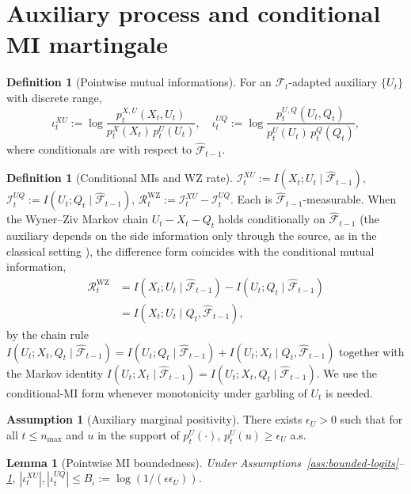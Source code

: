 \documentclass[11pt]{article}
\newcommand{\F}{\mathcal{F}}
\newcommand{\Fhat}{\hat{\F}}
\theoremstyle{plain}
\newtheorem{lemma}[theorem]{Lemma}
\theoremstyle{definition}
\newtheorem{definition}[theorem]{Definition}
\newtheorem{assumption}[theorem]{Assumption}
\theoremstyle{remark}
\begin{document}
\section{Auxiliary process and conditional MI martingale}\label{app:aux}

\begin{definition}[Pointwise mutual informations]\label{def:pmi-app}
For an $\F_t$-adapted auxiliary $\{U_t\}$ with discrete range,
\[
\iota_t^{XU} := \log \frac{p_t^{X,U}(X_t, U_t)}{p_t^X(X_t)\, p_t^U(U_t)},
\quad
\iota_t^{UQ} := \log \frac{p_t^{U,Q}(U_t, Q_t)}{p_t^U(U_t)\, p_t^Q(Q_t)},
\]
where conditionals are with respect to $\Fhat_{t-1}$.
\end{definition}

\begin{definition}[Conditional MIs and WZ rate]\label{def:WZ-rate}
$\mathcal{I}_t^{XU} := I(X_t; U_t \mid \Fhat_{t-1})$,
$\mathcal{I}_t^{UQ} := I(U_t; Q_t \mid \Fhat_{t-1})$,
$\mathcal{R}_t^{\mathrm{WZ}} := \mathcal{I}_t^{XU} - \mathcal{I}_t^{UQ}$.
Each is $\Fhat_{t-1}$-measurable. When the Wyner--Ziv Markov chain
$U_t - X_t - Q_t$ holds conditionally on $\Fhat_{t-1}$ (the
auxiliary depends on the side information only through the source,
as in the classical setting \citep{wyner1976rate}), the difference
form coincides with the conditional mutual information,
\[
\begin{split}
\mathcal{R}_t^{\mathrm{WZ}}
&= I(X_t; U_t \mid \Fhat_{t-1}) - I(U_t; Q_t \mid \Fhat_{t-1})\\
&= I(X_t; U_t \mid Q_t, \Fhat_{t-1}),
\end{split}
\]
by the chain rule $I(U_t; X_t, Q_t \mid \Fhat_{t-1}) =
I(U_t; Q_t \mid \Fhat_{t-1}) + I(U_t; X_t \mid Q_t, \Fhat_{t-1})$
together with the Markov identity $I(U_t; X_t \mid \Fhat_{t-1}) =
I(U_t; X_t, Q_t \mid \Fhat_{t-1})$. We use the conditional-MI form
whenever monotonicity under garbling of $U_t$ is needed.
\end{definition}

\begin{assumption}[Auxiliary marginal positivity]\label{ass:U-positivity}
There exists $\epsilon_U > 0$ such that for all $t \leq n_{\max}$ and
$u$ in the support of $p_t^U(\cdot)$, $p_t^U(u) \geq \epsilon_U$ a.s.
\end{assumption}

\begin{lemma}[Pointwise MI boundedness]\label{lem:pmi-bound-app}
Under Assumptions~\ref{ass:bounded-logits}--\ref{ass:U-positivity},
$|\iota_t^{XU}|, |\iota_t^{UQ}| \leq B_\iota := \log(1/(\epsilon\epsilon_U))$.
\end{lemma}
\end{document}
